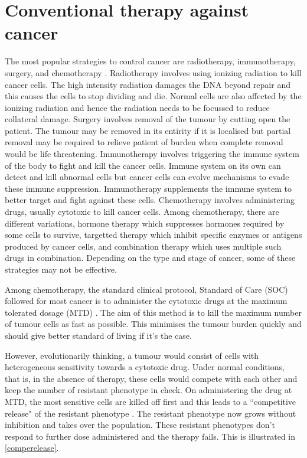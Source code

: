 \section{Conventional therapy against cancer}
The most popular strategies to control cancer are radiotherapy, immunotherapy, surgery, and chemotherapy \cite{cancer_therapy}. Radiotherapy involves using ionizing radiation to kill cancer cells. The high intensity radiation damages the DNA beyond repair and this causes the cells to stop dividing and die. Normal cells are also affected by the ionizing radiation and hence the radiation needs to be focussed to reduce collateral damage. Surgery involves removal of the tumour by cutting open the patient. The tumour may be removed in its entirity if it is localised but partial removal may be required to relieve patient of burden when complete removal would be life threatening. Immunotherapy involves triggering the immune system of the body to fight and kill the cancer cells. Immune system on its own can detect and kill abnormal cells but cancer cells can evolve mechanisms to evade these immune suppression. Immunotherapy supplements the immune system to better target and fight against these cells. Chemotherapy involves administering drugs, usually cytotoxic to kill cancer cells. Among chemotherapy, there are different variations, hormone therapy which suppresses hormones required by some cells to survive, targetted therapy which inhibit specific enzymes or antigens produced by cancer cells, and combination therapy which uses multiple such drugs in combination. Depending on the type and stage of cancer, some of these strategies may not be effective.

Among chemotherapy, the standard clinical protocol, Standard of Care (SOC) followed for most cancer is to administer the cytotoxic drugs at the maximum tolerated dosage (MTD) \cite{Frei}. The aim of this method is to kill the maximum number of tumour cells as fast as possible. This minimises the tumour burden quickly and should give better standard of living if it's the case.

However, evolutionarily thinking, a tumour would consist of cells with  heterogeneous sensitivity towards a cytotoxic drug. Under normal conditions, that is, in the absence of therapy, these cells would compete with each other and keep the number of resistant phenotype in check. On administering the drug at MTD, the most sensitive cells are killed off first and this leads to a ``competitive release" of the resistant phenotype \cite{Scott}. The resistant phenotype now grows without inhibition and takes over the population. These resistant phenotypes don't respond to further dose administered and the therapy fails. This is illustrated in \autoref{comperelease}.

